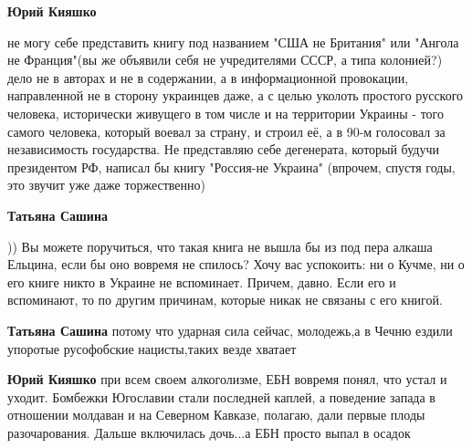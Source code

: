 \begin{itemize}
\begin{itemize}
\textbf{Юрий Кияшко} 

не могу себе представить книгу под названием "США не Британия" или "Ангола не
Франция"(вы же объявили себя не учредителями СССР, а типа колонией?) дело не в
авторах и не в содержании, а в информационной провокации, направленной не в
сторону украинцев даже, а с целью уколоть простого русского человека,
исторически живущего в том числе и на территории Украины - того самого
человека, который воевал за страну, и строил её, а в 90-м голосовал за
независимость государства. Не представляю себе дегенерата, который будучи
президентом РФ, написал бы книгу "Россия-не Украина" (впрочем, спустя годы, это
звучит уже даже торжественно)


 
\textbf{Татьяна Сашина} 

)) Вы можете поручиться, что такая книга не вышла бы из под пера алкаша
Ельцина, если бы оно вовремя не спилось? Хочу вас успокоить: ни о Кучме, ни о
его книге никто в Украине не вспоминает. Причем, давно. Если его и вспоминают,
то по другим причинам, которые никак не связаны с его книгой.

 
\textbf{Татьяна Сашина} потому что ударная сила сейчас, молодежь,а в Чечню ездили упоротые русофобские нацисты,таких везде хватает

 
\textbf{Юрий Кияшко} при всем своем алкоголизме, ЕБН вовремя понял, что устал и уходит. Бомбежки Югославии стали последней каплей, а поведение запада в отношении молдаван и на Северном Кавказе, полагаю, дали первые плоды разочарования. Дальше включилась дочь...а ЕБН просто выпал в осадок

 

\end{itemize}
\end{itemize}

